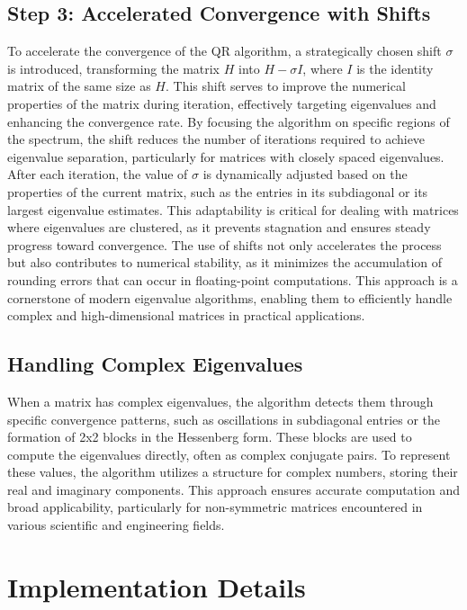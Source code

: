 \documentclass[a4paper,11pt,oneside]{report}
\begin{document}
\section{ Step 3: Accelerated Convergence with Shifts}
To accelerate the convergence of the QR algorithm, a strategically chosen shift \(\sigma\) is introduced, transforming the matrix \(H\) into \(H - \sigma I\), where \(I\) is the identity matrix of the same size as \(H\). This shift serves to improve the numerical properties of the matrix during iteration, effectively targeting eigenvalues and enhancing the convergence rate. By focusing the algorithm on specific regions of the spectrum, the shift reduces the number of iterations required to achieve eigenvalue separation, particularly for matrices with closely spaced eigenvalues. After each iteration, the value of \(\sigma\) is dynamically adjusted based on the properties of the current matrix, such as the entries in its subdiagonal or its largest eigenvalue estimates. This adaptability is critical for dealing with matrices where eigenvalues are clustered, as it prevents stagnation and ensures steady progress toward convergence. The use of shifts not only accelerates the process but also contributes to numerical stability, as it minimizes the accumulation of rounding errors that can occur in floating-point computations. This approach is a cornerstone of modern eigenvalue algorithms, enabling them to efficiently handle complex and high-dimensional matrices in practical applications.

\section{ Handling Complex Eigenvalues}
When a matrix has complex eigenvalues, the algorithm detects them through specific convergence patterns, such as oscillations in subdiagonal entries or the formation of 2x2 blocks in the Hessenberg form. These blocks are used to compute the eigenvalues directly, often as complex conjugate pairs. To represent these values, the algorithm utilizes a structure for complex numbers, storing their real and imaginary components. This approach ensures accurate computation and broad applicability, particularly for non-symmetric matrices encountered in various scientific and engineering fields.

\chapter{ Implementation Details}
\end{document}
